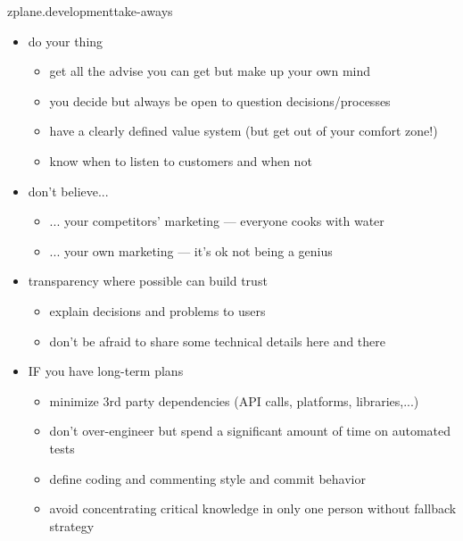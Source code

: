         \begin{frame}{zplane.development}{take-aways}
					\vspace{-3mm}
					\begin{itemize}
						\item<1-> do your thing 
							\begin{itemize}
								\item get all the advise you can get but make up your own mind
								\item you decide but always be open to question decisions/processes
								\item have a clearly defined value system (but get out of your comfort zone!)
								\item know when to listen to customers and when not
							\end{itemize} 
						\smallskip
						\item<2-> don't believe... 
							\begin{itemize}
								\item ... your competitors' marketing --- everyone cooks with water
								\item ... your own marketing --- it's ok not being a genius
							\end{itemize}
						\smallskip
						\item<3-> transparency where possible can build trust
							\begin{itemize}
								\item explain decisions and problems to users
								\item	don't be afraid to share some technical details here and there
							\end{itemize}
						\smallskip
						\item<4-> IF you have long-term plans
							\begin{itemize}
								\item 	minimize 3rd party dependencies (API calls, platforms, libraries,...)
								\item		don't over-engineer but spend a significant amount of time on automated tests
								\item		define coding and commenting style and commit behavior
								\item		avoid concentrating critical knowledge in only one person without fallback strategy
							\end{itemize}
					\end{itemize}
        \end{frame}
        
        



